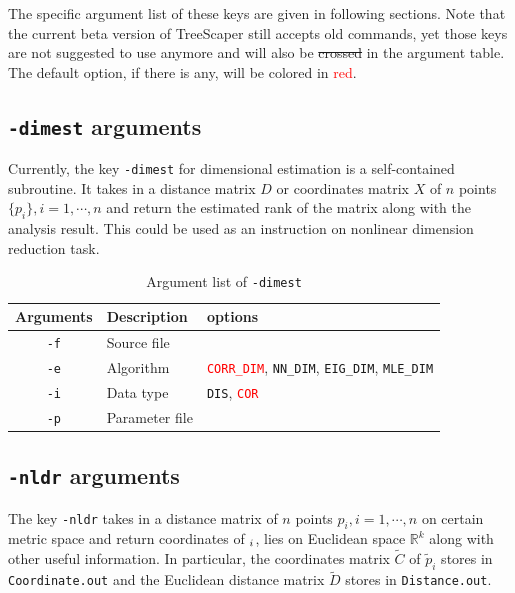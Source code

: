 \documentclass[11pt,a4paper]{article}
\theoremstyle{definition}
\theoremstyle{definition}
\numberwithin{equation}{section}
\begin{document}
	The specific argument list of these keys are given in following sections. Note that the current beta version of TreeScaper still accepts old commands, yet those keys are not suggested to use anymore and will also be \st{crossed} in the argument table. The default option, if there is any, will be colored in \textcolor{red}{red}.
	
	\clearpage
	\subsection{\texttt{-dimest} arguments}
	
	Currently, the key \texttt{-dimest} for dimensional estimation is a self-contained subroutine. It takes in a distance matrix $D$ or coordinates matrix $X$ of $n$ points $\{p_i\},i=1,\cdots,n$ and return the estimated rank of the matrix along with the analysis result. This could be used as an instruction on nonlinear dimension reduction task.
	
	\begin{table}[!h]
		\centering
		\begin{tabular}{cll}
			\hline
			Arguments & Description & options\\
			\hline
			\texttt{-f}& Source file &  \\
			\hline
			\texttt{-e}& Algorithm & \textcolor{red}{\texttt{CORR\_DIM}}, \texttt{NN\_DIM}, \texttt{EIG\_DIM}, \texttt{MLE\_DIM}\\
			\hline
			\texttt{-i}& Data type& \texttt{DIS}, \textcolor{red}{\texttt{COR}}\\
			\hline
			\texttt{-p}& Parameter file&\\
			\hline
		\end{tabular}
		\caption{Argument list of \texttt{-dimest}}
		\label{tab:dimestlist}
	\end{table}
	
	
	\subsection{\texttt{-nldr} arguments}
	
	The key \texttt{-nldr} takes in a distance matrix of $n$ points $p_i, i =1,\cdots, n$ on certain metric space and return coordinates of $\title{p}_i$, lies on Euclidean space $\mathbb{R}^k$ along with other useful information. In particular, the coordinates matrix $\tilde{C}$ of $\tilde{p}_i$ stores in \texttt{Coordinate.out} and the Euclidean distance matrix $\tilde{D}$ stores in \texttt{Distance.out}.
	
\end{document}

